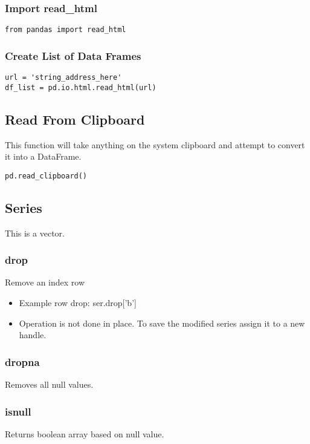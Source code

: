 %
\subsubsection{Import read\_html}
\begin{lstlisting}
from pandas import read_html
\end{lstlisting}

%
\subsubsection{Create List of Data Frames}
\begin{lstlisting}
url = 'string_address_here'
df_list = pd.io.html.read_html(url)
\end{lstlisting}

\subsection{Read From Clipboard}
This function will take anything on the system clipboard and attempt to convert
it into a DataFrame.
\begin{lstlisting}
pd.read_clipboard()
\end{lstlisting}

\subsection{Series}
This is a vector.

\subsubsection{drop}
Remove an index row
  \begin{itemize}

    \item Example row drop: ser.drop['b']

    \item Operation is not done in place.  To save the modified series
      assign it to a new handle.
  \end{itemize}

\subsubsection{dropna}
Removes all null values.

\subsubsection{isnull}
Returns boolean array based on null value.

